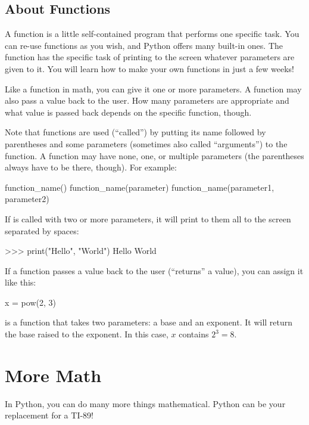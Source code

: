 \documentclass[11pt]{cselabheader}
\begin{document}
\subsection{About Functions}

A function is a little self-contained program that performs one specific task.
You can re-use functions as you wish, and Python offers many built-in ones. The
function  has the specific task of printing to the screen
whatever parameters are given to it. You will learn how to make your own
functions in just a few weeks!

Like a function in math, you can give it one or more parameters. A function may
also pass a value back to the user. How many parameters are appropriate and what
value is passed back depends on the specific function, though.

Note that functions are used (``called'') by putting its name followed by
parentheses and some parameters (sometimes also called ``arguments'') to the
function. A function may have none, one, or multiple parameters (the parentheses
always have to be there, though). For example:

\begin{python3code}
function_name()
function_name(parameter)
function_name(parameter1, parameter2)
\end{python3code}

If  is called with two or more parameters, it will print to
them all to the screen separated by spaces:

\begin{pyconcode}
>>> print("Hello", "World")
Hello World
\end{pyconcode}

If a function passes a value back to the user (``returns'' a value), you can
assign it like this:

\begin{python3code}
x = pow(2, 3)
\end{python3code}

 is a function that takes two parameters: a base and an
exponent. It will return the base raised to the exponent. In this case, $x$
contains $2^3 = 8$.

\pagebreak

\section{More Math}

In Python, you can do many more things mathematical. Python can be your
replacement for a TI-89!
\end{document}
